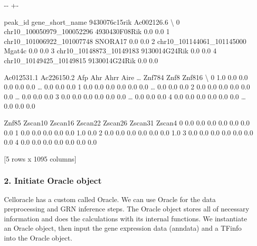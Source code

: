 \documentclass[letterpaper,10pt,english]{sphinxmanual}
\newlength\nbsphinxcodecellspacing
\begin{document}
{

\kern-\sphinxverbatimsmallskipamount\kern-\baselineskip
\kern+\FrameHeightAdjust\kern-\fboxrule
\vspace{\nbsphinxcodecellspacing}

\begin{sphinxVerbatim}[commandchars=\\\{\}]
\llap{\color{nbsphinxout}[7]:\,\hspace{\fboxrule}\hspace{\fboxsep}}                     peak\_id gene\_short\_name  9430076c15rik  Ac002126.6  \textbackslash{}
0  chr10\_100050979\_100052296   4930430F08Rik            0.0         0.0
1  chr10\_101006922\_101007748         SNORA17            0.0         0.0
2  chr10\_101144061\_101145000          Mgat4c            0.0         0.0
3    chr10\_10148873\_10149183   9130014G24Rik            0.0         0.0
4    chr10\_10149425\_10149815   9130014G24Rik            0.0         0.0

   Ac012531.1  Ac226150.2  Afp  Ahr  Ahrr  Aire  {\ldots}  Znf784  Znf8  Znf816  \textbackslash{}
0         1.0         0.0  0.0  0.0   0.0   0.0  {\ldots}     0.0   0.0     0.0
1         0.0         0.0  0.0  0.0   0.0   0.0  {\ldots}     0.0   0.0     0.0
2         0.0         0.0  0.0  0.0   0.0   0.0  {\ldots}     0.0   0.0     0.0
3         0.0         0.0  0.0  0.0   0.0   0.0  {\ldots}     0.0   0.0     0.0
4         0.0         0.0  0.0  0.0   0.0   0.0  {\ldots}     0.0   0.0     0.0

   Znf85  Zscan10  Zscan16  Zscan22  Zscan26  Zscan31  Zscan4
0    0.0      0.0      0.0      0.0      0.0      0.0     0.0
1    0.0      0.0      0.0      0.0      0.0      1.0     0.0
2    0.0      0.0      0.0      0.0      0.0      0.0     1.0
3    0.0      0.0      0.0      0.0      0.0      0.0     0.0
4    0.0      0.0      0.0      0.0      0.0      0.0     0.0

[5 rows x 1095 columns]
\end{sphinxVerbatim}
}


\subsubsection{2. Initiate Oracle object}
\label{\detokenize{notebooks/04_Network_analysis/Network_analysis_with_with_Paul_etal_2015_data:2.-Initiate-Oracle-object}}
Celloracle has a custom called Oracle. We can use Oracle for the data preprocessing and GRN inference steps. The Oracle object stores all of necessary information and does the calculations with its internal functions. We instantiate an Oracle object, then input the gene expression data (anndata) and a TFinfo into the Oracle object.
\end{document}
